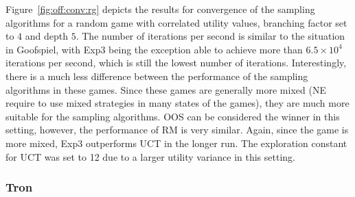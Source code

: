 Figure~\ref{fig:off:conv:rg} depicts the results for convergence of the sampling algorithms for a random game with correlated utility values, branching factor set to $4$ and depth $5$.
The number of iterations per second is similar to the situation in Goofspiel, with Exp3 being the exception able to achieve more than $6.5\times10^4$ iterations per second, which is still the lowest number of iterations.
Interestingly, there is a much less difference between the performance of the sampling algorithms in these games.
Since these games are generally more mixed (\ie NE require to use mixed strategies in many states of the games), they are much more suitable for the sampling algorithms.
OOS can be considered the winner in this setting, however, the performance of RM is very similar.
Again, since the game is more mixed, Exp3 outperforms UCT in the longer run.
The exploration constant for UCT was set to 12 due to a larger utility variance in this setting.

\subsubsection{Tron}

